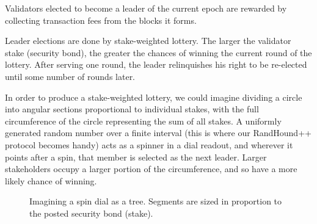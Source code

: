 \documentclass[a4paper, 10pt, conference]{ieeeconf}
\begin{document}
Validators elected to become a leader of the current epoch are rewarded by collecting transaction fees from the blocks it forms.

Leader elections are done by stake-weighted lottery. The larger the validator stake (security bond), the greater the chances of winning the current round of the lottery. After serving one round, the leader relinquishes his right to be re-elected until some number of rounds later.

In order to produce a stake-weighted lottery, we could imagine dividing a circle into angular sections proportional to individual stakes, with the full circumference of the circle representing the sum of all stakes. A uniformly generated random number over a finite interval (this is where our RandHound++ protocol becomes handy) acts as a spinner in a dial readout, and wherever it points after a spin, that member is selected as the next leader. Larger stakeholders occupy a larger portion of the circumference, and so have a more likely chance of winning.

\begin{figure}[h!]
\centering

%

\bigskip

%

\caption{Imagining a spin dial as a tree. Segments
are sized in proportion to the posted security bond (stake).}
  \label{fig:spinner}
\end{figure}
\end{document}
